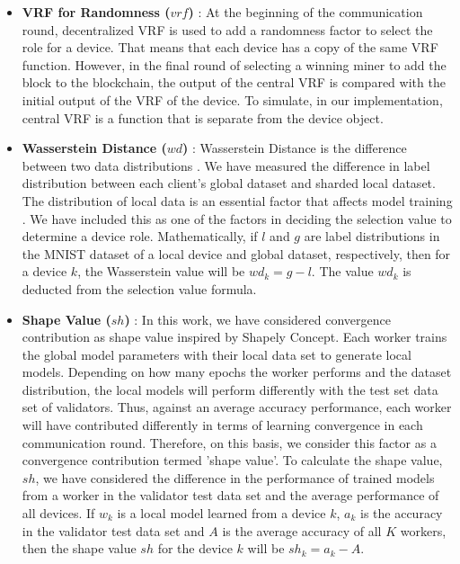 \begin{itemize}
\begin{figure}[!h]
    \end{figure}
    \item \textbf{VRF for Randomness ($vrf$)} \label{module:vrf}:
    At the beginning of the communication round, decentralized VRF is used to add a randomness factor 
    to select the role for a device.
    That means that each device has a copy of the same VRF function.
    However, in the final round of selecting a winning miner to add the block to the blockchain, the output of the central VRF is compared with the initial output of the VRF of the device.
    To simulate, in our implementation, central VRF is a function that is separate from the device object.
   
    \item \textbf{Wasserstein Distance ($wd$)} :
    Wasserstein Distance is the difference between two data distributions \cite{huang2021shapley}.
    We have measured the difference in label distribution between each client's global dataset and sharded local dataset.
    The distribution of local data is an essential factor that affects model training \cite{data_distribution_Mustafa}.
    We have included this as one of the factors in deciding the selection value to determine a device role.
    Mathematically, if $l$ and $g$ are label distributions in the MNIST dataset of a local device and global dataset, respectively, then for a device $k$, the Wasserstein value will be
    $wd_k = g - l.$
    The value $wd_k$ is deducted from the selection value formula. 
   
    \item \textbf{Shape Value ($sh$)} :
    In this work, we have considered convergence contribution as shape value inspired by Shapely Concept.
    Each worker trains the global model parameters with their local data set to generate local models.
    Depending on how many epochs the worker performs and the dataset distribution, 
    the local models will perform differently with the test set data set of validators.
    Thus, against an average accuracy performance, each worker will have contributed differently in terms of learning convergence in each communication round.
    Therefore, on this basis, we consider this factor as a convergence contribution termed 'shape value'.
    To calculate the shape value, $sh$, we have considered the difference in the performance of trained models from a worker in the validator test data set and the average performance of all devices.
    If $w_k$ is a local model learned from a device $k$, $a_k$ is the accuracy in the validator test data set and $A$ is the average accuracy of all $K$ workers, then the shape value $sh$ for the device $k$ will be $sh_k = a_k - A$.
    

\end{itemize}
